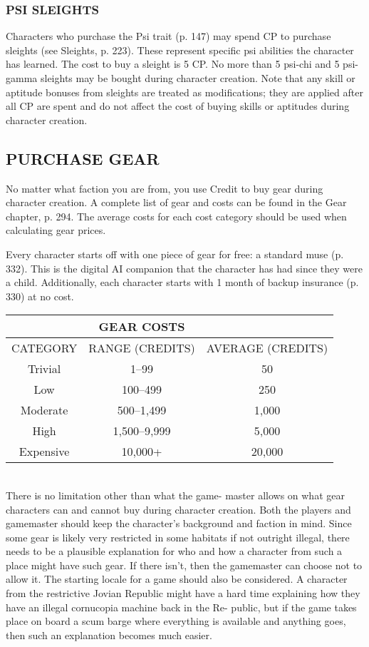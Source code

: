 \subsubsection{PSI SLEIGHTS}
Characters who purchase the Psi trait (p. 147) may
spend CP to purchase sleights (see Sleights, p. 223).
These represent specific psi abilities the character has
learned. The cost to buy a sleight is 5 CP. No more
than 5 psi-chi and 5 psi-gamma sleights may be bought
during character creation.
Note that any skill or aptitude bonuses from
sleights are treated as modifications; they are applied
after all CP are spent and do not affect the cost of
buying skills or aptitudes during character creation.

  \subsection{PURCHASE GEAR}

  No matter what faction you are from, you use Credit
  to buy gear during character creation. A complete list
  of gear and costs can be found in the Gear chapter, p.
  294. The average costs for each cost category should
  be used when calculating gear prices.

                  
 Every character starts off with one piece of gear
 for free: a standard muse (p. 332). This is the digital
 AI companion that the character has had since they
 were a child. Additionally, each character starts with 1
 month of backup insurance (p. 330) at no cost.
 



\begin{tabular}{|c|c|c|}
\hline
& GEAR COSTS &\\ 
\hline
CATEGORY & RANGE (CREDITS) & AVERAGE (CREDITS)\\ 
\hline
Trivial & 1–99 & 50\\ 
\hline
Low & 100–499 & 250\\ 
\hline
Moderate & 500–1,499 & 1,000\\ 
\hline
High & 1,500–9,999 & 5,000\\ 
\hline
Expensive & 10,000+ & 20,000\\ 
\hline
\end{tabular} 
\\

There is no limitation other than what the game-
master allows on what gear characters can and cannot
buy during character creation. Both the players and
gamemaster should keep the character’s background
and faction in mind. Since some gear is likely very
restricted in some habitats if not outright illegal, there
needs to be a plausible explanation for who and how
a character from such a place might have such gear.
If there isn’t, then the gamemaster can choose not to
allow it. The starting locale for a game should also
be considered. A character from the restrictive Jovian
Republic might have a hard time explaining how they
have an illegal cornucopia machine back in the Re-
public, but if the game takes place on board a scum
barge where everything is available and anything goes,
then such an explanation becomes much easier.


